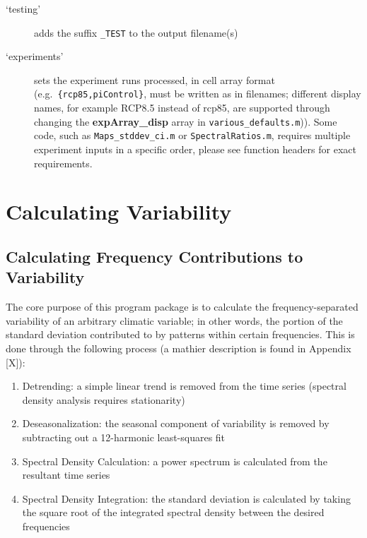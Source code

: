 \documentclass{article}
\begin{document}
\begin{description}
\item [`testing'] adds the suffix \texttt{\_TEST} to the output filename(s)
\item [`experiments'] sets the experiment runs processed, in cell array format (e.g.\ \texttt{\{rcp85,piControl\}}, must be written as in filenames; different display names, for example RCP8.5 instead of rcp85, are supported through changing the \textbf{expArray\_disp} array in \texttt{various\_defaults.m})). Some code, such as \texttt{Maps\_stddev\_ci.m} or \texttt{SpectralRatios.m}, requires multiple experiment inputs in a specific order, please see function headers for exact requirements. 
\end{description}

\section{Calculating Variability} %
\subsection{Calculating Frequency Contributions to Variability}
\label{sec:var}\label{func:Variability.m}
The core purpose of this program package is to calculate the frequency-separated variability of an arbitrary climatic variable; in other words, the portion of the standard deviation contributed to by patterns within certain frequencies. This is done through the following process (a mathier description is found in Appendix [X]):

\begin{enumerate}
\item Detrending: a simple linear trend is removed from the time series (spectral density analysis requires stationarity)
\item Deseasonalization: the seasonal component of variability is removed by subtracting out a 12-harmonic least-squares fit
\item Spectral Density Calculation: a power spectrum is calculated from the resultant time series
\item Spectral Density Integration: the standard deviation is calculated by taking the square root of the integrated spectral density between the desired frequencies
\end{enumerate}
\end{document}

